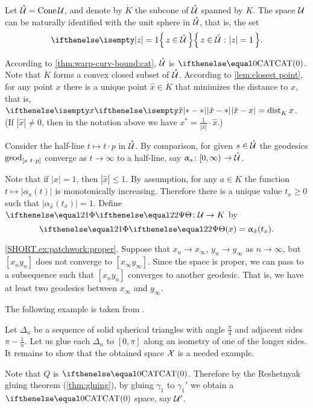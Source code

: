 Let $\mathring{\mathcal{U}}=\mathop{\rm Cone}\nolimits \mathcal{U}$, and 
denote by $\mathring{K}$ the subcone of $\mathring{\mathcal{U}}$ spanned by $K$.
The space $\mathcal{U}$ can be naturally identified with the unit sphere in $\mathring{\mathcal{U}}$, 
that is, the set 
\[\set{z\in \mathring{\spc{U}}}{|z|=1}.\]

According to \ref{thm:warp-curv-bound:cat}, $\mathring{\mathcal{U}}$ is $\CAT0$.
Note that $\mathring{K}$ forms a convex closed subset of $\mathring{\mathcal{U}}$.
According to \ref{lem:closest point}, for any point $x$ there is a unique point $\hat x\in \mathring{K}$
that minimizes the distance to $x$,
that is, $\dist{\hat x}{x}{}=\distfun{K}{x}{}$.
(If $|\hat x|\ne0$, then in the notation above we have
$x^*=\tfrac1{|\hat x|}\cdot\hat x$.)

Consider the half-line $t\mapsto t\cdot p$ in  $\mathring{\mathcal{U}}$.
By comparison, 
for given $s\in \mathring{\spc{U}}$
the geodesics $\geod_{[s\ t\cdot p]}$ converge as $t\to\infty$ to a half-line, 
say $\alpha_s\:[0,\infty)\to \mathring{\spc{U}}$.



Note that if $|x|=1$, then $|\hat x|\le 1$.
By assumption, for any $a\in K$ the function $t\mapsto |\alpha_a(t)|$ is monotonically increasing.
Therefore there is a unique value $t_x\ge 0$ such that
$|\alpha_{\hat x}(t_x)|=1$.
Define $\map[2]\:\spc{U}\to K$
 by 
\[\map[2](x)=\alpha_{\hat x}(t_x).\]

\parbf{\ref{ex:patchwork};} \ref{SHORT.ex:patchwork:proper}.
Suppose that $x_n\to x_\infty$, $y_n\to y_\infty$ as $n\to\infty$,
but $[x_ny_n]$ does not converge to $[x_\infty y_\infty]$.
Since the space is proper, we can pass to a subsequence such that $[x_ny_n]$ converges to another geodesic.
That is, we have at least two geodesics between $x_\infty$ and $y_\infty$.

 The following example is taken from \cite[Chapter I, Exercise 3.14]{bridson-haefliger}.

Let $\Delta_n$ be a sequence of solid spherical triangles 
with angle $\tfrac\pi4$ and adjacent sides $\pi-\tfrac1n$.
Let us glue each $\Delta_n$ to $[0,\pi]$ along an isometry of one of the longer sides.
It remains to show that the obtained space $\mathcal{X}$ is a needed example.

Note that 
$Q$ 
is $\CAT0$.
Therefore by the Reshetnyak gluing theorem (\ref{thm:gluing}),
by gluing 
$\gamma_1$ 
to $\gamma_1'$ 
we obtain a $\CAT0$ space, say $\mathcal{U}'$.

